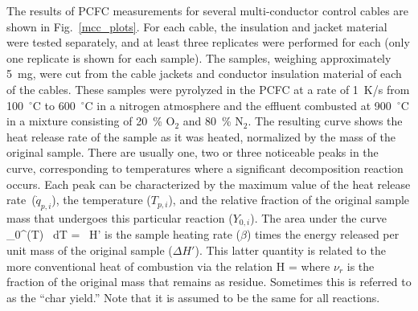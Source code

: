 \documentclass[11pt]{book}
\begin{document}
The results of PCFC measurements for several multi-conductor control cables are shown in Fig.~\ref{mcc_plots}.
For each cable, the insulation and jacket material were tested separately, and at least three replicates were performed for each
(only one replicate is shown for each sample). The samples, weighing approximately 5~mg, were cut from the cable jackets and conductor
insulation material of each of the cables. These samples were pyrolyzed in the PCFC at a rate of 1~K/s
from 100~$^\circ$C to 600~$^\circ$C in a nitrogen atmosphere and the effluent combusted at 900~$^\circ$C in a mixture consisting of 20~\% O$_2$
and 80~\% N$_2$. The resulting curve shows the heat release rate of the sample as it was heated, normalized by the mass of the original sample.
There are usually one, two or three noticeable peaks in the curve, corresponding to temperatures where a significant decomposition reaction occurs.
Each peak can be characterized by the maximum value of the heat release rate~($\dot{q}_{p,i}$), the temperature ($T_{p,i}$), and the relative fraction of the original sample mass that undergoes this particular reaction ($Y_{0,i}$). The area under the curve
\be \int_0^\infty {}(T) \, dT = \beta \, \Delta H' \ee
is the sample heating rate ($\beta$) times the energy released per unit mass of the original sample ($\Delta H'$). This latter quantity is
related to the more conventional heat of combustion via the relation
\be \Delta H =  \ee
where $\nu_r$ is the fraction of the original mass that remains as residue. Sometimes this is referred to as the ``char yield.'' Note that it is
assumed to be the same for all reactions.
\end{document}
